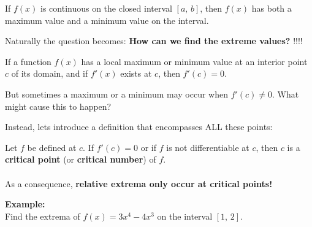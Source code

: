 \documentclass[addpoints, 12pt]{exam}
\begin{document}
\begin{tcolorbox}[title= THE EXTREME VALUE THEOREM,colframe=black,sharp corners,colback=white,colbacktitle=white,coltitle=black,boxrule=1pt]

    If $f(x)$ is continuous on the closed interval $[a,\,b]$, then $f(x)$ has both a maximum value and a minimum value on the interval.
    
\end{tcolorbox}
\vspace{1cm}
Naturally the question becomes: \textbf{How can we find the extreme values?} \underline{\hspace{3cm}}!!!!


\newpage


\begin{tcolorbox}[title= DEFINITION OF LOCAL EXTREME VALUES,colframe=black,sharp corners,colback=white,colbacktitle=white,coltitle=black,boxrule=1pt]

    If a function $f(x)$ has a local maximum or minimum value at an interior point $c$ of its domain, and if $f'(x)$ exists at $c$, then $f'(c)=0$. 
    
\end{tcolorbox}
\vspace{1cm}
But sometimes a maximum or a minimum may occur when $f'(c)\ne0$. What might cause this to happen?
\begin{center}
    \underline{\hspace{6cm}}
\end{center}
\vspace{2cm}

Instead, lets introduce a definition that encompasses ALL these points:\\

\begin{tcolorbox}[title= DEFINITION OF A CRITICAL POINT,colframe=black,sharp corners,colback=white,colbacktitle=white,coltitle=black,boxrule=1pt]

    Let $f$ be defined at $c$. If $f'(c)=0$ or if $f$ is not differentiable at $c$, then $c$ is a \textbf{critical point} (or \textbf{critical number}) of $f$.\\
    \\
    As a consequence, \textbf{relative extrema only occur at critical points!}
    
\end{tcolorbox}
\vspace{.15cm}
\noindent\textbf{Example:}\\
Find the extrema of $f(x)=3x^4-4x^3$ on the interval $[1,\,2]$.
\end{document}
